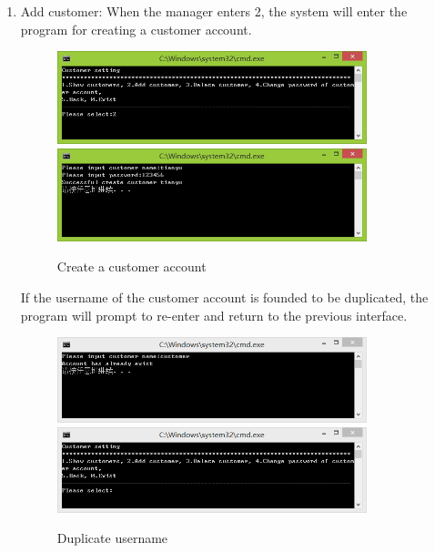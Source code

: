 \documentclass{article}
\begin{document}
\begin{enumerate}
    \item Add customer:\newline 
    When the manager enters 2, the system will enter the program for creating a customer account.
        \begin{figure}[H]
        \centering
        \includegraphics[width=0.85\textwidth]{A/A2a.jpg}
        \includegraphics[width=0.85\textwidth]{A/A2b.jpg}
        \caption{Create a customer account}
        \end{figure}
    \noindent
    If the username of the customer account is founded to be duplicated, the program will prompt to re-enter and return to the previous interface.
        \begin{figure}[H]
        \centering
        \includegraphics[width=0.85\textwidth]{A/A2c.png}
        \includegraphics[width=0.85\textwidth]{A/A2d.png}
        \caption{Duplicate username}
        \end{figure}
    

\end{enumerate}
\end{document}
